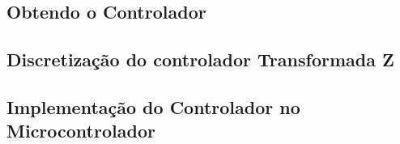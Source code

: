 \subsection{Obtendo o Controlador}



\subsection{Discretização do controlador Transformada Z}



\subsection{Implementação do Controlador no Microcontrolador}